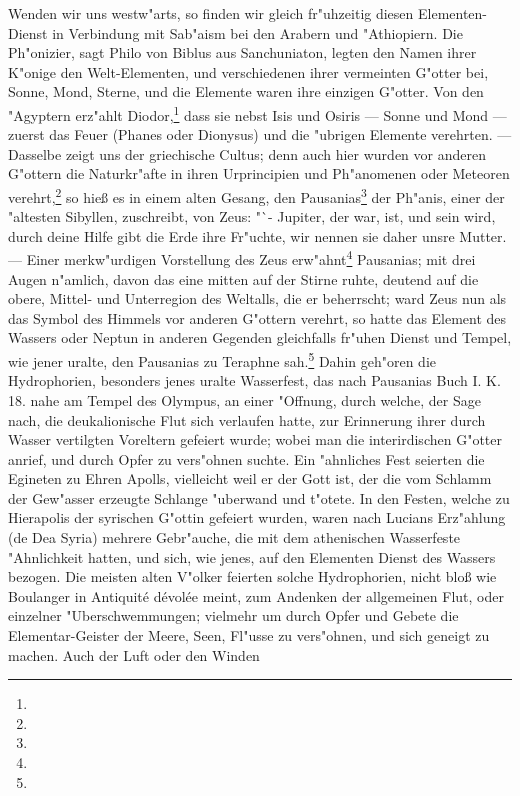 \documentclass[a4paper, 11pt, oneside, polutonikogreek, german]{article}
\begin{document}
Wenden wir uns westw"arts, so finden wir gleich fr"uhzeitig diesen Elementen-Dienst in Verbindung mit Sab"aism bei den Arabern und "Athiopiern. Die Ph"onizier, sagt Philo von Biblus aus Sanchuniaton, legten den Namen ihrer K"onige den Welt-Elementen, und verschiedenen ihrer vermeinten G"otter bei, Sonne, Mond, Sterne, und die Elemente waren ihre einzigen G"otter. Von den "Agyptern erz"ahlt Diodor,\footnote{} dass sie nebst Isis und Osiris --- Sonne und Mond --- zuerst das Feuer (Phanes oder Dionysus) und die "ubrigen Elemente verehrten. --- Dasselbe zeigt uns der griechische Cultus; denn auch hier wurden vor anderen G"ottern die Naturkr"afte in ihren Urprincipien und Ph"anomenen oder Meteoren verehrt,\footnote{} so hieß es in einem alten Gesang, den Pausanias\footnote{} der Ph"anis, einer der "altesten Sibyllen, zuschreibt, von Zeus: "`- Jupiter, der war, ist, und sein wird, durch deine Hilfe gibt die Erde ihre Fr"uchte, wir nennen sie daher unsre Mutter. --- Einer merkw"urdigen Vorstellung des Zeus erw"ahnt\footnote{} Pausanias; mit drei Augen n"amlich, davon das eine mitten auf der Stirne ruhte, deutend auf die obere, Mittel- und Unterregion des Weltalls, die er beherrscht; ward Zeus nun als das Symbol des Himmels vor anderen G"ottern verehrt, so hatte das Element des Wassers oder Neptun in anderen Gegenden gleichfalls fr"uhen Dienst und Tempel, wie jener uralte, den Pausanias zu Teraphne sah.\footnote{} Dahin geh"oren die Hydrophorien, besonders jenes uralte Wasserfest, das nach Pausanias Buch I. K. 18. nahe am Tempel des Olympus, an einer "Offnung, durch welche, der Sage nach, die deukalionische Flut sich verlaufen hatte, zur Erinnerung ihrer durch Wasser vertilgten Voreltern gefeiert wurde; wobei man die interirdischen G"otter anrief, und durch Opfer zu vers"ohnen suchte. Ein "ahnliches Fest seierten die Egineten zu Ehren Apolls, vielleicht weil er der Gott ist, der die vom Schlamm der Gew"asser erzeugte Schlange "uberwand und t"otete. In den Festen, welche zu Hierapolis der syrischen G"ottin gefeiert wurden, waren nach Lucians Erz"ahlung (de Dea Syria) mehrere Gebr"auche, die mit dem athenischen Wasserfeste "Ahnlichkeit hatten, und sich, wie jenes, auf den Elementen Dienst des Wassers bezogen. Die meisten alten V"olker feierten solche Hydrophorien, nicht bloß wie Boulanger in Antiquité dévolée meint, zum Andenken der allgemeinen Flut, oder einzelner "Uberschwemmungen; vielmehr um durch Opfer und Gebete die Elementar-Geister der Meere, Seen, Fl"usse zu vers"ohnen, und sich geneigt zu machen. Auch der Luft oder den Winden 
\end{document}
